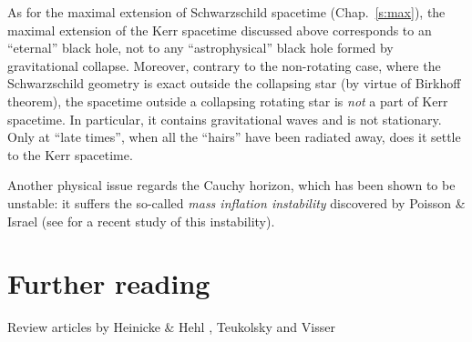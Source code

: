 As for the maximal extension of Schwarzschild spacetime (Chap.~\ref{s:max}), the
maximal extension of the Kerr spacetime discussed above
corresponds to an ``eternal'' black hole, not to any ``astrophysical'' black hole
formed by gravitational
collapse. Moreover, contrary to the non-rotating case, where the Schwarzschild geometry
is exact outside the collapsing star (by virtue of Birkhoff theorem), the spacetime outside
a collapsing rotating star is \emph{not} a part of Kerr spacetime. In particular, it contains gravitational waves and is not stationary. Only at ``late times'', when all the ``hairs'' have
been radiated away, does it settle to the Kerr spacetime.

Another physical issue regards the Cauchy horizon, which
has been shown to be unstable: it suffers the so-called
\emph{mass inflation instability}
discovered by Poisson \& Israel \cite{PoissI90}
(see \cite{BurkoKZ16} for a recent study of this instability).

\section{Further reading}

Review articles by
Heinicke \& Hehl \cite{HeiniH15}, Teukolsky \cite{Teuko15} and
Visser \cite{Visse09}
